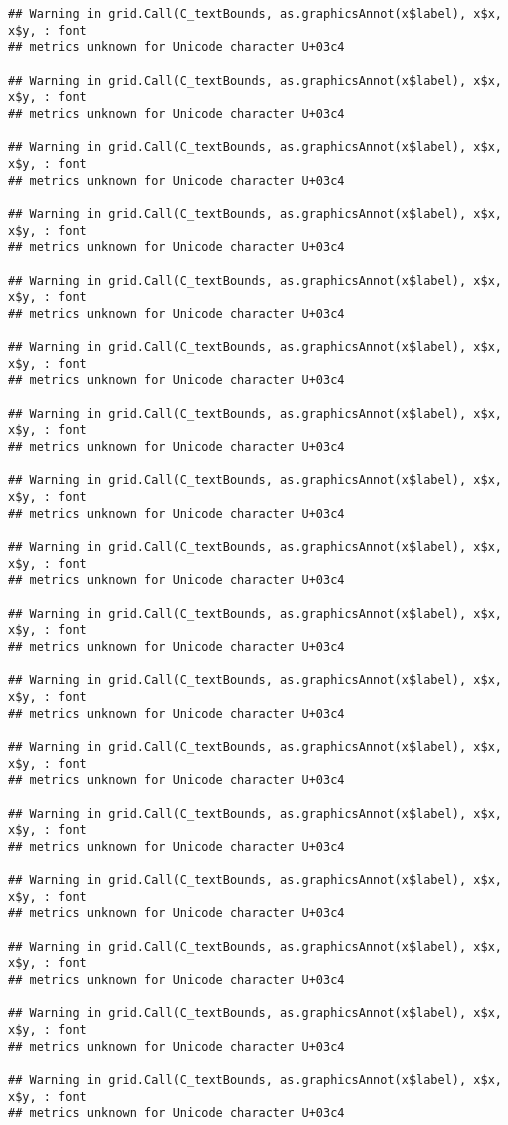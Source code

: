 \documentclass[
]{article}
\begin{document}
\begin{verbatim}
## Warning in grid.Call(C_textBounds, as.graphicsAnnot(x$label), x$x, x$y, : font
## metrics unknown for Unicode character U+03c4

## Warning in grid.Call(C_textBounds, as.graphicsAnnot(x$label), x$x, x$y, : font
## metrics unknown for Unicode character U+03c4

## Warning in grid.Call(C_textBounds, as.graphicsAnnot(x$label), x$x, x$y, : font
## metrics unknown for Unicode character U+03c4

## Warning in grid.Call(C_textBounds, as.graphicsAnnot(x$label), x$x, x$y, : font
## metrics unknown for Unicode character U+03c4

## Warning in grid.Call(C_textBounds, as.graphicsAnnot(x$label), x$x, x$y, : font
## metrics unknown for Unicode character U+03c4

## Warning in grid.Call(C_textBounds, as.graphicsAnnot(x$label), x$x, x$y, : font
## metrics unknown for Unicode character U+03c4

## Warning in grid.Call(C_textBounds, as.graphicsAnnot(x$label), x$x, x$y, : font
## metrics unknown for Unicode character U+03c4

## Warning in grid.Call(C_textBounds, as.graphicsAnnot(x$label), x$x, x$y, : font
## metrics unknown for Unicode character U+03c4

## Warning in grid.Call(C_textBounds, as.graphicsAnnot(x$label), x$x, x$y, : font
## metrics unknown for Unicode character U+03c4

## Warning in grid.Call(C_textBounds, as.graphicsAnnot(x$label), x$x, x$y, : font
## metrics unknown for Unicode character U+03c4

## Warning in grid.Call(C_textBounds, as.graphicsAnnot(x$label), x$x, x$y, : font
## metrics unknown for Unicode character U+03c4

## Warning in grid.Call(C_textBounds, as.graphicsAnnot(x$label), x$x, x$y, : font
## metrics unknown for Unicode character U+03c4

## Warning in grid.Call(C_textBounds, as.graphicsAnnot(x$label), x$x, x$y, : font
## metrics unknown for Unicode character U+03c4

## Warning in grid.Call(C_textBounds, as.graphicsAnnot(x$label), x$x, x$y, : font
## metrics unknown for Unicode character U+03c4

## Warning in grid.Call(C_textBounds, as.graphicsAnnot(x$label), x$x, x$y, : font
## metrics unknown for Unicode character U+03c4

## Warning in grid.Call(C_textBounds, as.graphicsAnnot(x$label), x$x, x$y, : font
## metrics unknown for Unicode character U+03c4

## Warning in grid.Call(C_textBounds, as.graphicsAnnot(x$label), x$x, x$y, : font
## metrics unknown for Unicode character U+03c4
\end{verbatim}
\end{document}
